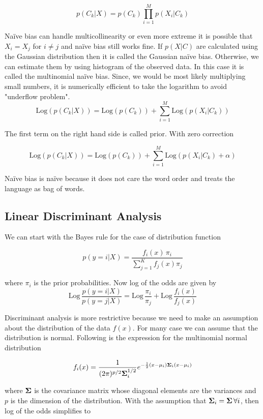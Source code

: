 \documentclass[11pt]{article}
\theoremstyle{definition}
\begin{document}
$$
p(C_k|X) = p(C_k) \prod_{i=1}^M p(X_i |C_k)
$$

Naïve bias can handle multicollinearity or even more extreme it is possible that $X_i=X_j$ for $i\neq j$ and naïve bias still works fine. If $p(X|C)$ are calculated using the Gaussian distribution then it is called the Gaussian naïve bias. Otherwise, we can estimate them by using histogram of the observed data. In this case it is called the multinomial naïve bias. Since, we would be most likely multiplying small numbers, it is numerically efficient to take the logarithm to avoid "underflow problem". 
$$
\text{Log}\left( p(C_k | X) \right) = \text{Log}\left( p(C_k)\right) + \sum_{i=1}^M \text{Log}\left(p(X_i|C_k)\right)
$$


The first term on the right hand side is called prior. With zero correction 

$$
\text{Log}\left( p(C_k | X) \right) = \text{Log}\left( p(C_k)\right) + \sum_{i=1}^M \text{Log}\left(p(X_i|C_k)+ \alpha \right)
$$

Naïve bias is naïve because it does not care the word order and treats the language as bag of words. 





\subsection{Linear Discriminant Analysis }

We can start with the Bayes rule for the case of distribution function 

$$
p(y=i|X) = \frac{f_i(x)\, \pi_i}{\sum_{j=1}^K f_j(x)\pi_j}
$$


where $\pi_i$ is the prior probabilities. Now log of the odds are given by 
$$
\text{Log}\, \frac{p(y=i|X)}{p(y=j|X)} = \text{Log}\,\frac{\pi_i}{\pi_j} + \text{Log}\,\frac{f_i(x)}{f_j(x)}
$$


Discriminant analysis is more restrictive because we need to make an assumption about the distribution of the data $f(x)$. For many case we can assume that the distribution is normal. Following is the expression for the multinomial normal distribution

$$
f_i(x) = \frac{1}{(2\pi)^{p/2}{\bf{\Sigma}}_i^{1/2}} e^{-\frac{1}{2}(x-\mu_i){\bf{\Sigma}}_i (x-\mu_i)}
$$


where $\bf{\Sigma}$ is the covariance matrix whose diagonal elements are the variances and $p$ is the dimension of the distribution. With the assumption that ${\bf{\Sigma}}_i = {\bf{\Sigma}} \, \forall i$, then log of the odds simplifies to 
\end{document}
